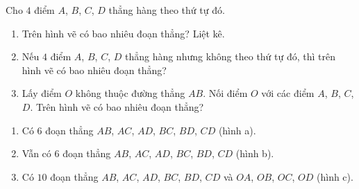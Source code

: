 \begin{bt}%
	Cho $4$ điểm $A$, $B$, $C$, $D$ thẳng hàng theo thứ tự đó.
	\begin{enumerate}
		\item Trên hình vẽ có bao nhiêu đoạn thẳng? Liệt kê.
		\item Nếu $4$ điểm $A$, $B$, $C$, $D$ thẳng hàng nhưng không theo thứ tự đó, thì trên hình vẽ có bao nhiêu đoạn thẳng?
		\item Lấy điểm $O$ không thuộc đường thẳng $AB$. Nối điểm $O$ với các điểm $A$, $B$, $C$, $D$. Trên hình vẽ có bao nhiêu đoạn thẳng?
	\end{enumerate}
	\loigiai
	{
		\begin{center}
		\end{center}
		\begin{enumerate}
			\item Có $6$ đoạn thẳng $AB$, $AC$, $AD$, $BC$, $BD$, $CD$ (hình a).
			\item Vẫn có $6$ đoạn thẳng $AB$, $AC$, $AD$, $BC$, $BD$, $CD$ (hình b).
			\item Có $10$ đoạn thẳng $AB$, $AC$, $AD$, $BC$, $BD$, $CD$ và $OA$, $OB$, $OC$, $OD$ (hình c).
		\end{enumerate}
	}
\end{bt}

